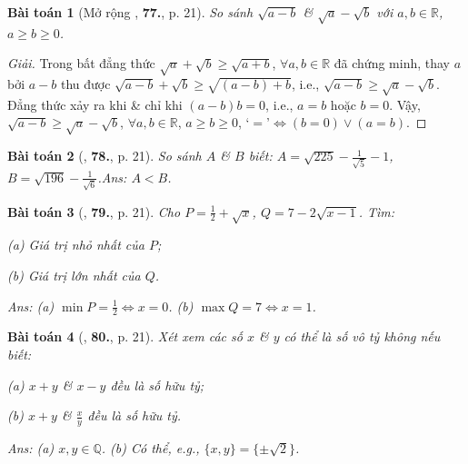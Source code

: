 \documentclass{article}
\numberwithin{equation}{section}
\newtheorem{baitoan}{Bài toán}
\begin{document}
\begin{baitoan}[Mở rộng \cite{Tuyen_Toan_7}, \textbf{77.}, p. 21]
	So sánh $\sqrt{a - b}$ \& $\sqrt{a} - \sqrt{b}$ với $a,b\in\mathbb{R}$, $a\ge b\ge 0$.
\end{baitoan}

\begin{proof}[Giải]
	Trong bất đẳng thức $\sqrt{a} + \sqrt{b}\ge\sqrt{a + b}$, $\forall a,b\in\mathbb{R}$ đã chứng minh, thay $a$ bởi $a - b$ thu được $\sqrt{a - b} + \sqrt{b}\ge\sqrt{(a - b) + b}$, i.e., $\sqrt{a - b}\ge\sqrt{a} - \sqrt{b}$. Đẳng thức xảy ra khi \& chỉ khi $(a - b)b = 0$, i.e., $a = b$ hoặc $b = 0$. Vậy, $\sqrt{a - b}\ge\sqrt{a} - \sqrt{b}$, $\forall a,b\in\mathbb{R}$, $a\ge b\ge 0$, `$=$'$\Leftrightarrow(b = 0)\lor(a = b)$.
\end{proof}

\begin{baitoan}[\cite{Tuyen_Toan_7}, \textbf{78.}, p. 21]
	So sánh $A$ \& $B$ biết: $A = \sqrt{225} - \frac{1}{\sqrt{5}} - 1$, $B = \sqrt{196} - \frac{1}{\sqrt{6}}$.\hfill\textsf{Ans:} $A < B$.
\end{baitoan}

\begin{baitoan}[\cite{Tuyen_Toan_7}, \textbf{79.}, p. 21]
	Cho $P = \frac{1}{2} + \sqrt{x}$, $Q = 7 - 2\sqrt{x - 1}$. Tìm:
	\begin{enumerate*}
		\item[(a)] Giá trị nhỏ nhất của $P$;
		\item[(b)] Giá trị lớn nhất của $Q$.
	\end{enumerate*}\hfill\textsf{Ans:} (a) $\min P = \frac{1}{2}\Leftrightarrow x = 0$. (b) $\max Q = 7\Leftrightarrow x = 1$.
\end{baitoan}

\begin{baitoan}[\cite{Tuyen_Toan_7}, \textbf{80.}, p. 21]
	Xét xem các số $x$ \& $y$ có thể là số vô tỷ không nếu biết:
	\begin{enumerate*}
		\item[(a)] $x + y$ \& $x - y$ đều là số hữu tỷ;
		\item[(b)] $x + y$ \& $\frac{x}{y}$ đều là số hữu tỷ.
	\end{enumerate*}\hfill\textsf{Ans:} (a) $x,y\in\mathbb{Q}$. (b) Có thể, e.g., $\{x,y\} = \{\pm\sqrt{2}\}$.
\end{baitoan}

\end{document}
